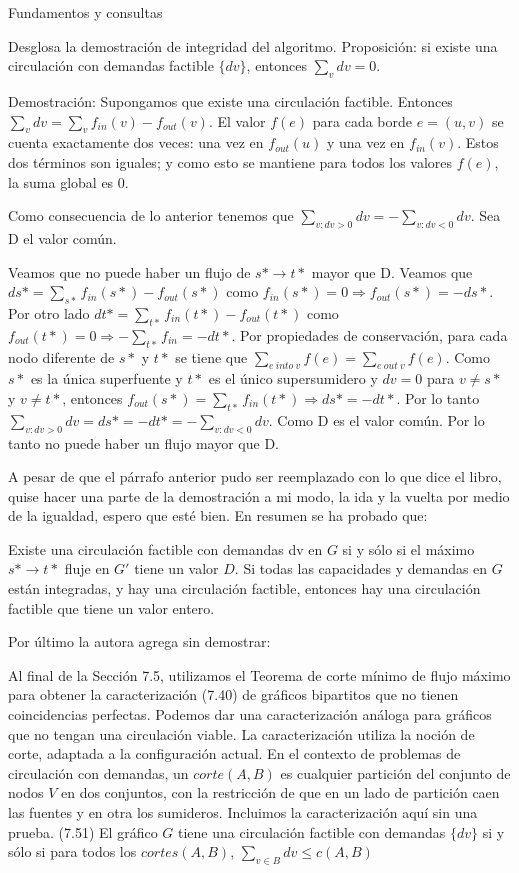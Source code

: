 \documentclass{article}
\begin{document}
\begin{section} {Fundamentos y consultas}
\begin{subsection}{Desglosa la demostración de integridad del algoritmo.}
		Proposición: si existe una circulación con demandas factible $\{dv\}$, entonces $\sum_{v}dv = 0$.
		
		Demostración: Supongamos que existe una circulación factible. Entonces $\sum_{v} dv = \sum_{v} f_{in} (v) - f_{out} (v)$. El valor $f(e)$ para cada borde $e = (u, v)$ se cuenta exactamente dos veces: una vez en $f_{out}(u)$ y una vez en $f_{in}(v)$. Estos dos términos son iguales; y como esto se mantiene para todos los valores $f(e)$, la suma global es 0.
		
		Como consecuencia de lo anterior tenemos que $\sum_{v:dv > 0} dv = - \sum_{v:dv<0} dv$. Sea D el valor común.
		
		Veamos que no puede haber un flujo de $s* \rightarrow t*$ mayor que D. Veamos que $ds* = \sum_{s*} f_{in} (s*) - f_{out} (s*)$ como $f_{in} (s*) = 0 \Rightarrow f_{out} (s*) = -ds*$. Por otro lado $dt* = \sum_{t*} f_{in} (t*) - f_{out} (t*)$ como $f_{out} (t*) = 0 \Rightarrow - \sum_{t*} f_{in} = -dt*$. Por propiedades de conservación, para cada nodo diferente de $s*$ y $t*$ se tiene que $\sum_{e \ into \ v} f(e) = \sum_{e \ out \ v} f(e)$. Como $s*$ es la única superfuente y $t*$ es el único supersumidero y $dv = 0$ para $v \neq s*$ y $ v \neq t*$, entonces $f_{out} (s*) = \sum_{t*} f_{in} (t*) \Rightarrow ds* = -dt*$. Por lo tanto $\sum_{v:dv>0} dv = ds* = - dt* = - \sum_{v:dv<0} dv$. Como D es el valor común. Por lo tanto no puede haber un flujo mayor que D.
		
		A pesar de que el párrafo anterior pudo ser reemplazado con lo que dice el libro, quise hacer una parte de la demostración a mi modo, la ida y la vuelta por medio de la igualdad, espero que esté bien. En resumen se ha probado que:
		
		Existe una circulación factible con demandas {dv} en $G$ si y sólo si el máximo $s* \rightarrow t*$ fluje en $G'$ tiene un valor $D$. Si todas las capacidades y demandas en $G$ están integradas, y hay una circulación factible, entonces hay una circulación factible que tiene un valor entero.
		
		Por último la autora agrega sin demostrar: 
		
		Al final de la Sección 7.5, utilizamos el Teorema de corte mínimo de flujo máximo para obtener la caracterización (7.40) de gráficos bipartitos que no tienen coincidencias perfectas. Podemos dar una caracterización análoga para gráficos que no tengan una circulación viable. La caracterización utiliza la noción de corte, adaptada a la configuración actual. En el contexto de problemas de circulación con demandas, un $corte(A, B)$ es cualquier partición del conjunto de nodos $V$ en dos conjuntos, con la restricción de que en un lado de partición caen las fuentes y en otra los sumideros. Incluimos la caracterización aquí sin una prueba. (7.51) El gráfico $G$ tiene una circulación factible con demandas $\{dv\}$ si y sólo si para todos los $cortes(A, B)$, $\sum_{v \in B} dv \leq c(A,B)$
		

\end{subsection}
\end{section}
\end{document}
